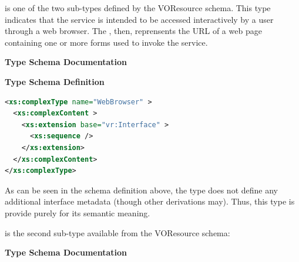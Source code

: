 \documentclass[11pt,a4paper]{ivoa}
\begin{document}
 is one of the two 
sub-types defined by the VOResource schema.  This type indicates that
the service is intended to be accessed interactively by a user through
a web browser.  The , then, reprensents
the URL of a web page containing one or more forms used to invoke the
service. 


\begingroup
      	\renewcommand*\descriptionlabel[1]{%
      	\hbox to 5.5em{\emph{#1}\hfil}}\vspace{2ex}\noindent\textbf{ Type Schema Documentation}



\vspace{1ex}\noindent\textbf{ Type Schema Definition}

\begin{lstlisting}[language=XML,basicstyle=\footnotesize]
<xs:complexType name="WebBrowser" >
  <xs:complexContent >
    <xs:extension base="vr:Interface" >
      <xs:sequence />
    </xs:extension>
  </xs:complexContent>
</xs:complexType>
\end{lstlisting}\endgroup


As can be seen in the schema definition above, the
 type does not define any additional
interface metadata (though other  derivations
may).  Thus, this type is provide purely for its semantic meaning.  



 is the second 
sub-type available from the VOResource schema:

\begingroup
      	\renewcommand*\descriptionlabel[1]{%
      	\hbox to 5.5em{\emph{#1}\hfil}}\vspace{2ex}\noindent\textbf{ Type Schema Documentation}

\end{document}
